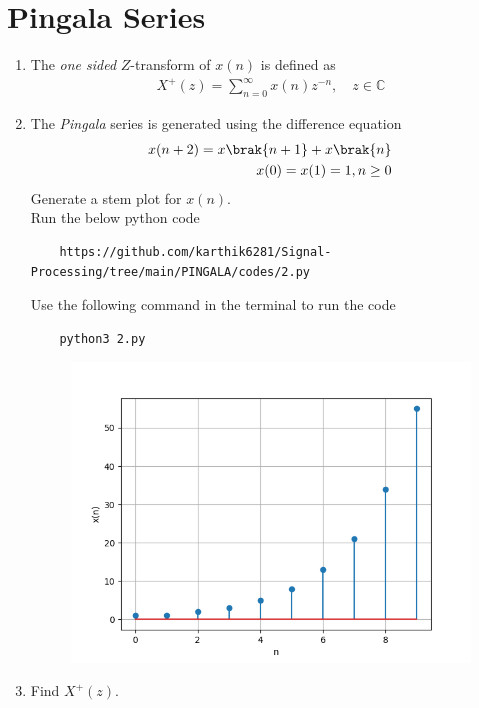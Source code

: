 \documentclass[journal,12pt,twocolumn]{IEEEtran}
\renewcommand\thesection{\arabic{section}}
\begin{document}
\section{Pingala Series}
\begin{enumerate}[label=\thesection.\arabic*,ref=\thesection.\theenumi]
\item The {\em one sided} $Z$-transform of $x(n)$ is defined as 
\begin{align}
	X^{+}(z) = \sum_{n = 0}^{\infty}x(n)z^{-n}, \quad z \in \mathbb{C}
	\label{eq:one-Z}
\end{align}
\item The {\em Pingala} series is generated using the difference equation 
\begin{align*}
	x(n+2) = x\brak{n+1} + x\brak{n}\\
	x(0) = x(1) = 1, n \ge 0
	\label{eq:10-pingala}
\end{align*}
Generate a stem plot for $x(n)$.\\
\solution
Run the below python code 
\begin{lstlisting}
	https://github.com/karthik6281/Signal-Processing/tree/main/PINGALA/codes/2.py
\end{lstlisting}
Use the following command in the terminal to run the code
\begin{lstlisting}
	python3 2.py
\end{lstlisting}
\begin{figure}[ht!]
	\centering
	\includegraphics[width=\columnwidth]{./figs/2_2.png}
	\caption{}
\end{figure}
\item Find $X^{+}(z)$.\\

\end{enumerate}
\end{document}

